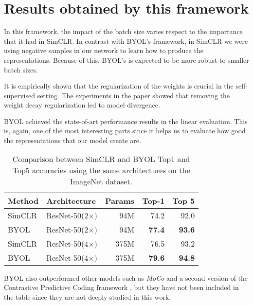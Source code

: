 \section{Results obtained by this framework}

In this framework, the impact of the batch size varies respect to the importance that it had in SimCLR. In contrast with BYOL's framework, in SimCLR we were using negative samples in our network to learn how to produce the representations. Because of this, BYOL's is expected to be more robust to smaller batch sizes. 

It is empirically shown that the regularization of the weights is crucial in the self-supervised setting. The experiments in the paper showed that removing the weight decay regularization led to model divergence.


BYOL achieved the state-of-art performance results in the linear evaluation. This is, again, one of the most interesting parts since it helps us to evaluate how good the representations that our model create are.

\begin{table}[H]
    \label{table:best:first:simclr}
\centering
\begin{tabular}{llrrr}
Method & Architecture & Params & Top-1 & Top 5 \\ \hline
SimCLR & ResNet-50($2\times)$ & 94M & 74.2 & 92.0 \\
BYOL & ResNet-50($2\times)$ & 94M & \textbf{77.4} & \textbf{93.6} \\
SimCLR & ResNet-50($4\times)$ & 375M & 76.5& 93.2 \\
BYOL & ResNet-50($4\times)$ & 375M & \textbf{79.6}& \textbf{94.8} \\
\end{tabular}
\caption{Comparison between SimCLR and BYOL Top1 and Top5 accuracies using the same architectures on the ImageNet dataset.}
\end{table}

BYOL also outperformed other models such as \emph{MoCo} \citep{he2020momentum} and a second version of the Contrastive Predictive Coding framework \citep{henaff2020dataefficient}, but they have not been included in the table since they are not deeply studied in this work.
